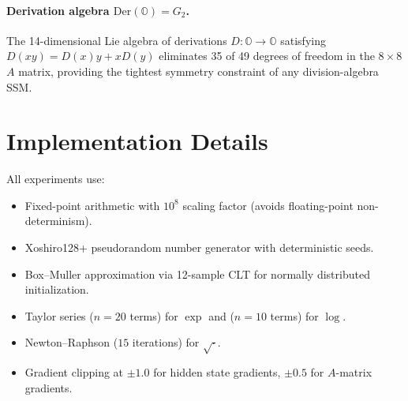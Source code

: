 \documentclass{article}
\newcommand{\Oct}{\mathbb{O}}
\begin{document}
\paragraph{Derivation algebra $\mathrm{Der}(\Oct) = G_2$.}
The 14-dimensional Lie algebra of derivations $D: \Oct \to \Oct$ satisfying $D(xy) = D(x)y + xD(y)$ eliminates 35 of 49 degrees of freedom in the $8 \times 8$ $A$ matrix, providing the tightest symmetry constraint of any division-algebra SSM.

\section{Implementation Details}
\label{app:implementation}

All experiments use:
\begin{itemize}
    \item Fixed-point arithmetic with $10^8$ scaling factor (avoids floating-point non-determinism).
    \item Xoshiro128+ pseudorandom number generator with deterministic seeds.
    \item Box--Muller approximation via 12-sample CLT for normally distributed initialization.
    \item Taylor series ($n=20$ terms) for $\exp$ and ($n=10$ terms) for $\log$.
    \item Newton--Raphson ($15$ iterations) for $\sqrt{\cdot}$.
    \item Gradient clipping at $\pm 1.0$ for hidden state gradients, $\pm 0.5$ for $A$-matrix gradients.
\end{itemize}
\end{document}
